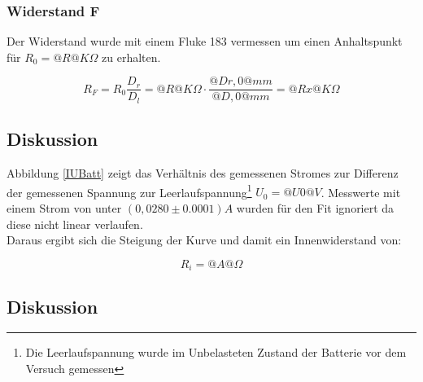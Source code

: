 \documentclass{article}
\begin{document}
\subsubsection{Widerstand F}

Der Widerstand wurde mit einem Fluke 183 vermessen um einen 
Anhaltspunkt für $R_0=@R@K\Omega$ zu erhalten.

$$R_F=R_0\frac{D_r}{D_l}=@R@ K\Omega \cdot \frac{@Dr,0@ mm}{@D,0@ mm} = @Rx@ K\Omega$$


\subsection{Diskussion}


Abbildung \ref{IUBatt} zeigt das Verhältnis des gemessenen Stromes zur
Differenz der gemessenen Spannung zur Leerlaufspannung\footnote{Die Leerlaufspannung 
wurde im Unbelasteten Zustand der Batterie vor dem Versuch gemessen} 
$U_0=@U0@V$. Messwerte mit einem Strom von unter $(0,0280\pm 0.0001) A$ wurden für den 
Fit ignoriert da diese nicht linear verlaufen. \\

Daraus ergibt sich die Steigung der Kurve und damit ein Innenwiderstand von: 

$$R_i=@A@ \Omega$$

\subsection{Diskussion}
\end{document}
